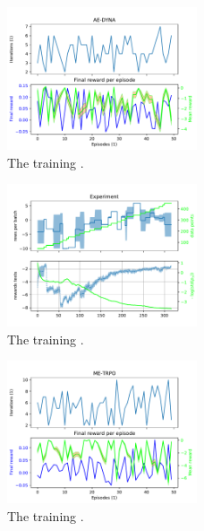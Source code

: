 \documentclass[
 reprint,
 amsmath,amssymb,amsfonts,clevref,
 aps,
prstab,
]{revtex4-2}
\begin{document}
\begin{figure}[!h]
  \centering
  \includegraphics*[width=0.5\textwidth]{Figures/AE-DYNA_verification.pdf}
  \caption{The training .}
  \label{fig:comparsion_per}
\end{figure}


\begin{figure}[!h]
  \centering
  \includegraphics*[width=0.5\textwidth]{Figures/ME-TRPO_observables.pdf}
  \caption{The training .}
  \label{fig:comparsion_per}
\end{figure}
\begin{figure}[!h]
  \centering
  \includegraphics*[width=0.5\textwidth]{Figures/ME-TRPO_verification.pdf}
  \caption{The training .}
  \label{fig:comparsion_per}
\end{figure}
\end{document}
